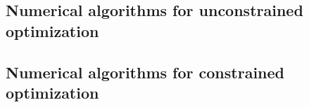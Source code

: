 \subsection{Numerical algorithms for unconstrained optimization}
\subsection{Numerical algorithms for constrained optimization}